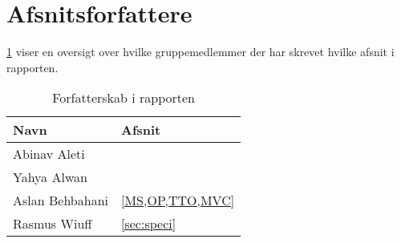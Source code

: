 \appendix
\appendixpage
\addappheadtotoc
\section{Afsnitsforfattere}\label{sec:arbejde}
\cref{tbl:arbejde} viser en oversigt over hvilke gruppemedlemmer der har skrevet hvilke afsnit i rapporten.
\begin{table}[H]
    \centering
    \caption{Forfatterskab i rapporten}\label{tbl:arbejde}
    \begin{tabular}{p{}p{}}
        \toprule
        Navn                        & Afsnit \\
        \midrule
        Abinav Aleti  &        \\
        \midrule
        Yahya Alwan   &        \\
        \midrule
        Aslan Behbahani & \cref{MS,OP,TTO,MVC}       \\
        \midrule
        Rasmus Wiuff  &    \cref{sec:speci}    \\
        \bottomrule
    \end{tabular}
\end{table}